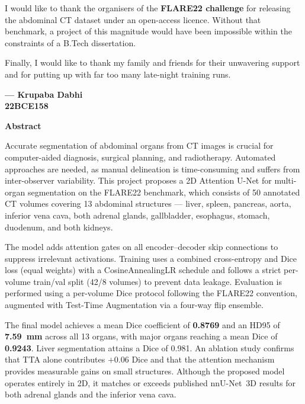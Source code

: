 \noindent
I would like to thank the organisers of the \textbf{FLARE22 challenge} for releasing the abdominal CT dataset under an open-access licence. Without that benchmark, a project of this magnitude would have been impossible within the constraints of a B.Tech dissertation.

\noindent
Finally, I would like to thank my family and friends for their unwavering support and for putting up with far too many late-night training runs.

\vspace{2cm}
\begin{flushright}
\textbf{--- Krupaba Dabhi}\\
\textbf{22BCE158}
\end{flushright}

\newpage
{}
\begin{center}
{\Large \bf Abstract}\\
\end{center}
\vspace{10pt}

\noindent
Accurate segmentation of abdominal organs from CT images is crucial for computer-aided diagnosis, surgical planning, and radiotherapy. Automated approaches are needed, as manual delineation is time-consuming and suffers from inter-observer variability. This project proposes a 2D Attention U-Net for multi-organ segmentation on the FLARE22 benchmark, which consists of 50 annotated CT volumes covering 13 abdominal structures --- liver, spleen, pancreas, aorta, inferior vena cava, both adrenal glands, gallbladder, esophagus, stomach, duodenum, and both kidneys.

\noindent
The model adds attention gates on all encoder--decoder skip connections to suppress irrelevant activations. Training uses a combined cross-entropy and Dice loss (equal weights) with a CosineAnnealingLR schedule and follows a strict per-volume train/val split (42/8 volumes) to prevent data leakage. Evaluation is performed using a per-volume Dice protocol following the FLARE22 convention, augmented with Test-Time Augmentation via a four-way flip ensemble.

\noindent
The final model achieves a mean Dice coefficient of \textbf{0.8769} and an HD95 of \textbf{7.59~mm} across all 13 organs, with major organs reaching a mean Dice of \textbf{0.9243}. Liver segmentation attains a Dice of 0.981. An ablation study confirms that TTA alone contributes $+$0.06 Dice and that the attention mechanism provides measurable gains on small structures. Although the proposed model operates entirely in 2D, it matches or exceeds published nnU-Net~3D results for both adrenal glands and the inferior vena cava.

